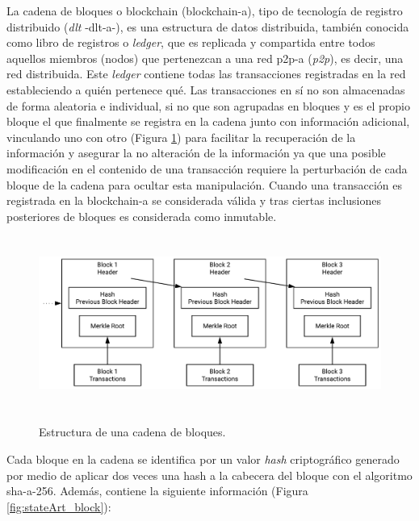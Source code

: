 \documentclass[12pt,a4paper, twoside]{report}
\begin{document}
	La cadena de bloques o \Gls{blockchain} (\gls{blockchain-a}), tipo de tecnología de registro distribuido (\textit{\gls{dlt}} -\gls{dlt-a}-), es una estructura de datos distribuida, también conocida como libro de registros o \textit{ledger}, que es replicada y compartida entre todos aquellos miembros (nodos) que pertenezcan a una red \gls{p2p-a} (\textit{\gls{p2p}}), es decir, una red distribuida. Este \textit{ledger} contiene todas las transacciones registradas en la red estableciendo a quién pertenece qué. Las transacciones en sí no son almacenadas de forma aleatoria e individual, si no que son agrupadas en bloques y es el propio bloque el que finalmente se registra en la cadena junto con información adicional, vinculando uno con otro (Figura \ref{fig:stateArt_linkblock}) para facilitar la recuperación de la información y asegurar la no alteración de la información ya que una posible modificación en el contenido de una transacción requiere la perturbación de cada bloque de la cadena para ocultar esta manipulación. Cuando una transacción es registrada en la \gls{blockchain-a} se considerada válida y tras ciertas inclusiones posteriores de bloques es considerada como inmutable.
		
		\begin{figure}[!ht]   
			\caption{Estructura de una cadena de bloques.} 
			\begin{center} 
				\includegraphics[width=14cm,height=5.7cm]{Images/stateArt/link_blocks} \\
				\label{fig:stateArt_linkblock} 
			\end{center}  
		\end{figure}
		
	 Cada bloque en la cadena se identifica por un valor \textit{hash} criptográfico generado por medio de aplicar dos veces una \gls{hash} a la cabecera del bloque con el algoritmo \gls{sha-a}-256. Además, contiene la siguiente información (Figura \ref{fig:stateArt_block}):
	 
\end{document}
